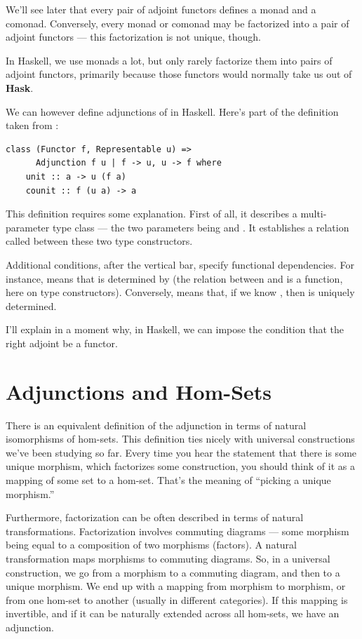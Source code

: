 We'll see later that every pair of adjoint functors defines a monad and
a comonad. Conversely, every monad or comonad may be factorized into a
pair of adjoint functors --- this factorization is not unique, though.

In Haskell, we use monads a lot, but only rarely factorize them into
pairs of adjoint functors, primarily because those functors would
normally take us out of \textbf{Hask}.

We can however define adjunctions of  in Haskell.
Here's part of the definition taken from
:

\begin{verbatim}
class (Functor f, Representable u) =>
      Adjunction f u | f -> u, u -> f where
    unit :: a -> u (f a)
    counit :: f (u a) -> a
\end{verbatim}
This definition requires some explanation. First of all, it describes a
multi-parameter type class --- the two parameters being  and
. It establishes a relation called  between
these two type constructors.

Additional conditions, after the vertical bar, specify functional
dependencies. For instance,  means that
 is determined by  (the relation between 
and  is a function, here on type constructors). Conversely,
 means that, if we know , then
 is uniquely determined.

I'll explain in a moment why, in Haskell, we can impose the condition
that the right adjoint  be a  functor.

\section{Adjunctions and Hom-Sets}\label{adjunctions-and-hom-sets}

There is an equivalent definition of the adjunction in terms of natural
isomorphisms of hom-sets. This definition ties nicely with universal
constructions we've been studying so far. Every time you hear the
statement that there is some unique morphism, which factorizes some
construction, you should think of it as a mapping of some set to a
hom-set. That's the meaning of ``picking a unique morphism.''

Furthermore, factorization can be often described in terms of natural
transformations. Factorization involves commuting diagrams --- some
morphism being equal to a composition of two morphisms (factors). A
natural transformation maps morphisms to commuting diagrams. So, in a
universal construction, we go from a morphism to a commuting diagram,
and then to a unique morphism. We end up with a mapping from morphism to
morphism, or from one hom-set to another (usually in different
categories). If this mapping is invertible, and if it can be naturally
extended across all hom-sets, we have an adjunction.

